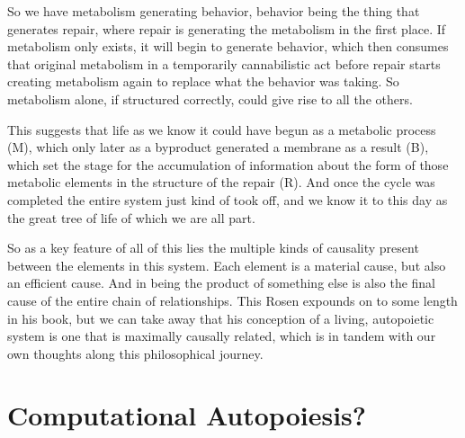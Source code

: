 \documentclass[12pt]{scrartcl}
\begin{document}
So we have metabolism generating behavior, behavior being the thing that generates repair, where repair is generating the metabolism in the first place.  If metabolism only exists, it will begin to generate behavior, which then consumes that original metabolism in a temporarily cannabilistic act before repair starts creating metabolism again to replace what the behavior was taking.  So metabolism alone, if structured correctly, could give rise to all the others.  

This suggests that life as we know it could have begun as a metabolic process (M), which only later as a byproduct generated a membrane as a result (B), which set the stage for the accumulation of information about the form of those metabolic elements in the structure of the repair (R).  And once the cycle was completed the entire system just kind of took off, and we know it to this day as the great tree of life of which we are all part.  

So as a key feature of all of this lies the multiple kinds of causality present between the elements in this system.  Each element is a material cause, but also an efficient cause.  And in being the product of something else is also the final cause of the entire chain of relationships.  This Rosen expounds on to some length in his book, but we can take away that his conception of a living, autopoietic system is one that is maximally causally related, which is in tandem with our own thoughts along this philosophical journey.

\section{Computational Autopoiesis?}
\end{document}
